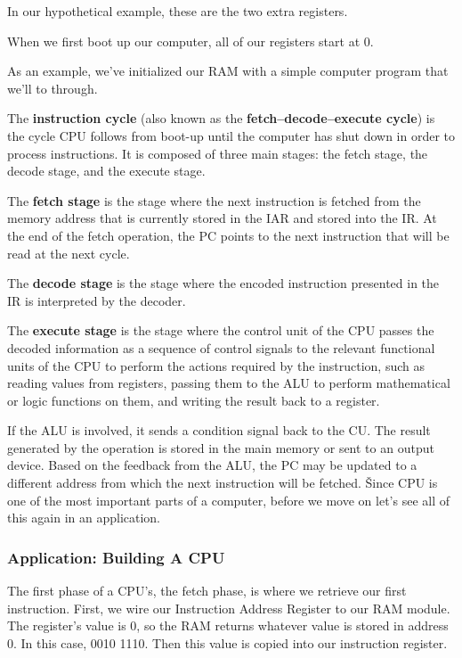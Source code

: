 \be
In our hypothetical example, these are the two extra registers.

\ee

When we first boot up our computer, all of our registers start at 0.

\be
As an example, we've initialized our RAM with a simple computer program that we'll to through.

\ee

The \textbf{instruction cycle} (also known as the \textbf{fetch–decode–execute cycle}) is the cycle CPU follows from
boot-up until the computer has shut down in order to process instructions. It is composed of three main stages: the
fetch stage, the decode stage, and the execute stage.
\ed

The \textbf{fetch stage} is the stage where the next instruction is fetched from the memory address that is currently
stored in the IAR and stored into the IR. At the end of the fetch operation, the PC points to the next instruction
that will be read at the next cycle.
\ed

The \textbf{decode stage} is the stage where the encoded instruction presented in the IR is interpreted by the
decoder.
\ed

The \textbf{execute stage} is the stage where the control unit of the CPU passes the decoded information as a
sequence of control signals to the relevant functional units of the CPU to perform the actions required by the
instruction, such as reading values from registers, passing them to the ALU to perform mathematical or logic
functions on them, and writing the result back to a register.
\ed

If the ALU is involved, it sends a condition signal back to the CU. The result generated by the operation is stored
in the main memory or sent to an output device. Based on the feedback from the ALU, the PC may be updated to a
different address from which the next instruction will be fetched. \v

Since CPU is one of the most important parts of a computer, before we move on let's see all of this again in an
application.

\subsubsection{Application: Building A CPU}

The first phase of a CPU's, the fetch phase, is where we retrieve our first instruction. First, we wire our
Instruction Address Register to our RAM module. The register's value is 0, so the RAM returns whatever value is
stored in address 0. In this case, 0010 1110. Then this value is copied into our instruction register.

